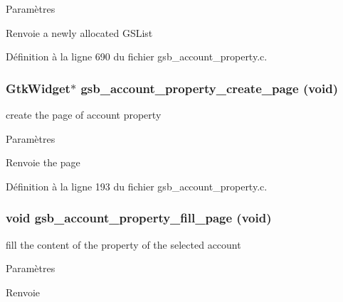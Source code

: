 \begin{DoxyParams}{Paramètres}
\item[{\em }]\end{DoxyParams}
\begin{DoxyReturn}{Renvoie}
a newly allocated GSList 
\end{DoxyReturn}


Définition à la ligne 690 du fichier gsb\_\-account\_\-property.c.

\subsubsection[{gsb\_\-account\_\-property\_\-create\_\-page}]{\setlength{\rightskip}{0pt plus 5cm}GtkWidget$\ast$ gsb\_\-account\_\-property\_\-create\_\-page (void)}\label{gsb__account__property_8c_a5266ddf452ec44e874324c9edc910f4e}
create the page of account property


\begin{DoxyParams}{Paramètres}
\item[{\em }]\end{DoxyParams}
\begin{DoxyReturn}{Renvoie}
the page 
\end{DoxyReturn}


Définition à la ligne 193 du fichier gsb\_\-account\_\-property.c.

\subsubsection[{gsb\_\-account\_\-property\_\-fill\_\-page}]{\setlength{\rightskip}{0pt plus 5cm}void gsb\_\-account\_\-property\_\-fill\_\-page (void)}\label{gsb__account__property_8c_ad38d51ca992f37d0392bd134617031ed}
fill the content of the property of the selected account


\begin{DoxyParams}{Paramètres}
\item[{\em }]\end{DoxyParams}
\begin{DoxyReturn}{Renvoie}

\end{DoxyReturn}


